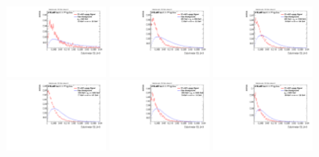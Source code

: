 \begin{figure}[H]
\includegraphics[width=0.3\textwidth]{sascha_input/Appendix/Distributions/w/distributions/beta3/h_recoJet_C2_3_bin1.pdf} \hspace{1mm}
\includegraphics[width=0.3\textwidth]{sascha_input/Appendix/Distributions/w/distributions/beta3/h_recoJet_C2_3_bin2.pdf} \hspace{1mm}
\includegraphics[width=0.3\textwidth]{sascha_input/Appendix/Distributions/w/distributions/beta3/h_recoJet_C2_3_bin3.pdf} 
\bigskip
\includegraphics[width=0.3\textwidth]{sascha_input/Appendix/Distributions/w/distributions/beta3/h_recoJet_C2_3_bin4.pdf} \hspace{1mm}
\includegraphics[width=0.3\textwidth]{sascha_input/Appendix/Distributions/w/distributions/beta3/h_recoJet_C2_3_bin5.pdf} \hspace{1mm}
\includegraphics[width=0.3\textwidth]{sascha_input/Appendix/Distributions/w/distributions/beta3/h_recoJet_C2_3_bin6.pdf}

\end{figure}
